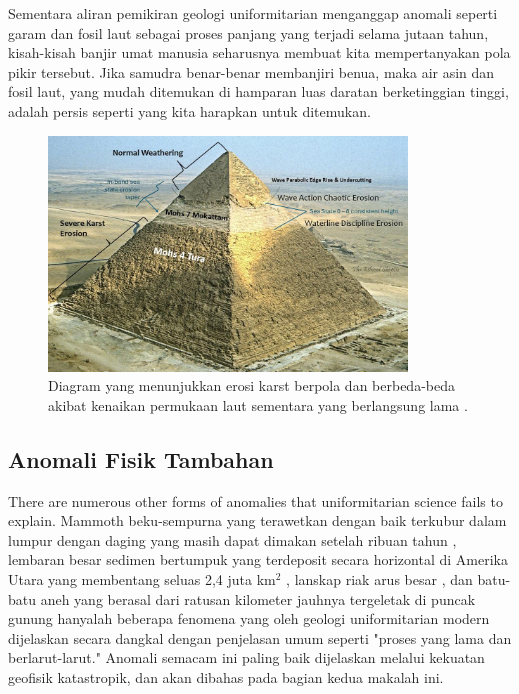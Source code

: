 \documentclass[10pt,twocolumn,letterpaper]{article}
\begin{document}
Sementara aliran pemikiran geologi uniformitarian menganggap anomali seperti garam dan fosil laut sebagai proses panjang yang terjadi selama jutaan tahun, kisah-kisah banjir umat manusia seharusnya membuat kita mempertanyakan pola pikir tersebut. Jika samudra benar-benar membanjiri benua, maka air asin dan fosil laut, yang mudah ditemukan di hamparan luas daratan berketinggian tinggi, adalah persis seperti yang kita harapkan untuk ditemukan.

\begin{figure}[t]
\begin{center}
\includegraphics[width=0.85\textwidth]{khafre.jpg}
\end{center}
   \caption{Diagram yang menunjukkan erosi karst berpola dan berbeda-beda akibat kenaikan permukaan laut sementara yang berlangsung lama \cite{27}.}
\label{fig:4}
\end{figure}

\subsection{Anomali Fisik Tambahan}
There are numerous other forms of anomalies that uniformitarian science fails to explain. Mammoth beku-sempurna yang terawetkan dengan baik terkubur dalam lumpur dengan daging yang masih dapat dimakan setelah ribuan tahun \cite{17,18,19}, lembaran besar sedimen bertumpuk yang terdeposit secara horizontal di Amerika Utara yang membentang seluas 2,4 juta km$^2$ \cite{21}, lanskap riak arus besar \cite{22}, dan batu-batu aneh yang berasal dari ratusan kilometer jauhnya tergeletak di puncak gunung \cite{23,26} hanyalah beberapa fenomena yang oleh geologi uniformitarian modern dijelaskan secara dangkal dengan penjelasan umum seperti "proses yang lama dan berlarut-larut." Anomali semacam ini paling baik dijelaskan melalui kekuatan geofisik katastropik, dan akan dibahas pada bagian kedua makalah ini.
\end{document}
